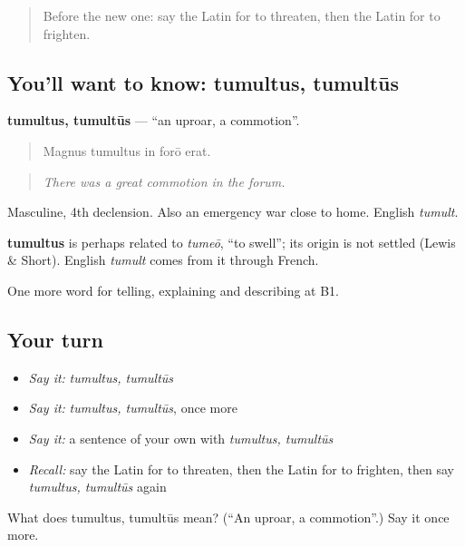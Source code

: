 \begin{quote}
Before the new one: say the Latin for to threaten, then the Latin for to frighten.
\end{quote}

\subsection*{You'll want to know: tumultus, tumultūs}
\textbf{tumultus, tumultūs} — \textquotedblleft{}an uproar, a commotion\textquotedblright{}.

\begin{quote}
Magnus tumultus in forō erat.
\end{quote}

\begin{quote}
\emph{There was a great commotion in the forum.}
\end{quote}

Masculine, 4th declension. Also an emergency war close to home. English \emph{tumult}.

\begin{cousinweb}
\textbf{tumultus} is perhaps related to \emph{tumeō}, \textquotedblleft{}to swell\textquotedblright{}; its origin is not settled (Lewis \& Short). English \emph{tumult} comes from it through French.
\end{cousinweb}

\begin{grammarlens}[title={What you've built}]
One more word for telling, explaining and describing at B1.
\end{grammarlens}

\subsection*{Your turn}
\begin{itemize}
\raggedright
  \item \emph{Say it:} \emph{tumultus, tumultūs}
  \item \emph{Say it:} \emph{tumultus, tumultūs}, once more
  \item \emph{Say it:} a sentence of your own with \emph{tumultus, tumultūs}
  \item \emph{Recall:} say the Latin for to threaten, then the Latin for to frighten, then say \emph{tumultus, tumultūs} again
\end{itemize}

\begin{tcolorbox}[breakable,colback=teal!4,colframe=teal!35!black,title={Before you move on}]
What does tumultus, tumultūs mean? (\textquotedblleft{}An uproar, a commotion\textquotedblright{}.) Say it once more.
\end{tcolorbox}
